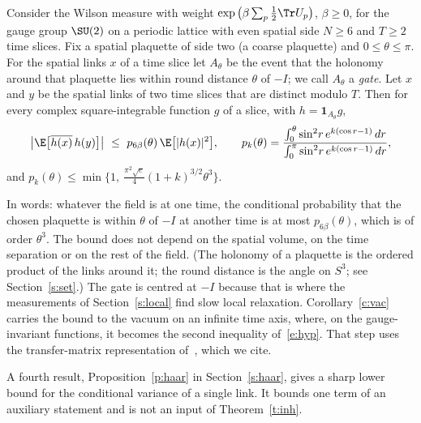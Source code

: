 \begin{theorem}\label{t:ret}
Consider the Wilson measure with weight $\exp\big(\beta\sum_p\tfrac12\Tr U_p\big)$, $\beta\ge0$, for the gauge
group $\SU(2)$ on a periodic lattice with even spatial side $N\ge6$ and $T\ge2$ time slices. Fix a spatial
plaquette of side two (a coarse plaquette) and $0\le\theta\le\pi$. For the spatial links $x$ of a time slice
let $A_\theta$ be the event that the holonomy around that plaquette lies within round distance $\theta$ of
$-I$; we call $A_\theta$ a \emph{gate}. Let $x$ and $y$ be the spatial links of two time slices that are distinct modulo $T$. Then for every
complex square-integrable function $g$ of a slice, with $h=\mathbf 1_{A_\theta}g$,
\begin{equation}\label{e:ret}
\big|\E\big[\overline{h(x)}\,h(y)\big]\big|\ \le\ p_{6\beta}(\theta)\,\E\big[|h(x)|^2\big],
\qquad
p_k(\theta)=\frac{\int_0^\theta\sin^2\!r\,e^{k(\cos r-1)}\,dr}{\int_0^\pi\sin^2\!r\,e^{k(\cos r-1)}\,dr},
\end{equation}
and $p_k(\theta)\le\min\{1,\ \tfrac{\pi^2\sqrt e}{4}(1+k)^{3/2}\theta^3\}$.
\end{theorem}

In words: whatever the field is at one time, the conditional probability that the chosen plaquette is within
$\theta$ of $-I$ at another time is at most $p_{6\beta}(\theta)$, which is of order $\theta^3$. The bound does not
depend on the spatial volume, on the time separation or on the rest of the field. (The holonomy of a
plaquette is the ordered product of the links around it; the round distance is the angle on $S^3$; see
Section~\ref{s:set}.) The gate is centred at $-I$ because that is where the measurements of
Section~\ref{s:local} find slow local relaxation. Corollary~\ref{c:vac} carries the bound to the vacuum on an
infinite time axis, where, on the gauge-invariant functions, it becomes the second inequality
of~\eqref{e:hyp}. That step uses the transfer-matrix representation of~\cite{Lu77,OS78}, which we cite.

A fourth result, Proposition~\ref{p:haar} in Section~\ref{s:haar}, gives a sharp lower bound for the
conditional variance of a single link. It bounds one term of an auxiliary statement and is not an input of
Theorem~\ref{t:inh}.


